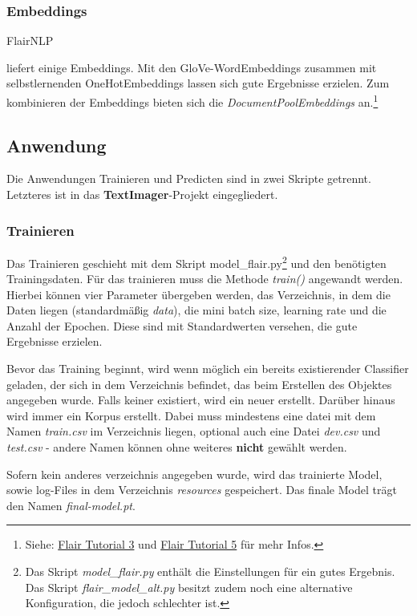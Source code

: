 \documentclass[10pt,a4paper]{article}
\begin{document}
\subsubsection{Embeddings}
\begin{flushleft}
\hypertarget{Embed}{FlairNLP} liefert einige Embeddings. Mit den GloVe-WordEmbeddings zusammen mit selbstlernenden OneHotEmbeddings lassen sich gute Ergebnisse erzielen. Zum kombinieren der Embeddings bieten sich die \textit{DocumentPoolEmbeddings}\cite{pool-embed} an.\footnote{Siehe: \href{https://github.com/flairNLP/flair/blob/master/resources/docs/TUTORIAL_3_WORD_EMBEDDING.md}{Flair Tutorial 3} und \href{https://github.com/flairNLP/flair/blob/master/resources/docs/TUTORIAL_5_WORD_EMBEDDING.md}{Flair Tutorial 5} für mehr Infos.}
\end{flushleft}

\subsection{Anwendung}
\begin{flushleft}
Die Anwendungen Trainieren und Predicten sind in zwei Skripte getrennt. Letzteres ist in das \textbf{TextImager}-Projekt eingegliedert.
\end{flushleft}

\subsubsection{Trainieren}
\begin{flushleft}
Das Trainieren geschieht mit dem Skript model\_flair.py\footnote{Das Skript \textit{model\_flair.py} enthält die Einstellungen für ein gutes Ergebnis. Das Skript \textit{flair\_model\_alt.py} besitzt zudem noch eine alternative Konfiguration, die jedoch schlechter ist.} und den benötigten Trainingsdaten. Für das trainieren muss die Methode \textit{train()} angewandt werden. Hierbei können vier Parameter übergeben werden, das Verzeichnis, in dem die Daten liegen (standardmäßig \textit{data}), die mini batch size, learning rate und die Anzahl der Epochen. Diese sind mit Standardwerten versehen, die gute Ergebnisse erzielen.

Bevor das Training beginnt, wird wenn möglich ein bereits existierender Classifier geladen, der sich in dem Verzeichnis befindet, das beim Erstellen des Objektes angegeben wurde. Falls keiner existiert, wird ein neuer erstellt. Darüber hinaus wird immer ein Korpus erstellt. Dabei muss mindestens eine datei mit dem Namen \textit{train.csv} im Verzeichnis liegen, optional auch eine Datei \textit{dev.csv} und \textit{test.csv} - andere Namen können ohne weiteres \textbf{nicht} gewählt werden.

Sofern kein anderes verzeichnis angegeben wurde, wird das trainierte Model, sowie log-Files in dem Verzeichnis \textit{resources} gespeichert. Das finale Model trägt den Namen \glqq\textit{final-model.pt}\grqq{}.
\end{flushleft}
\end{document}
